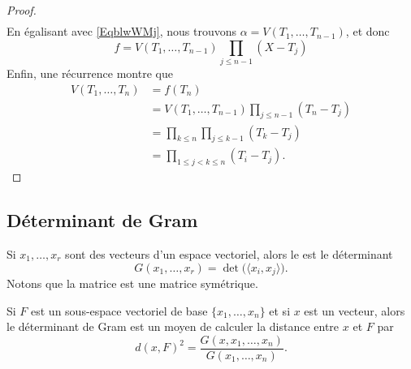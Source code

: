 \begin{proof}
\begin{subequations}
\begin{align}
        \end{align}
    \end{subequations}
    En égalisant avec \eqref{EqblwWMj}, nous trouvons \( \alpha=V(T_1,\ldots, T_{n-1})\), et donc
    \begin{equation}
        f=V(T_1,\ldots, T_{n-1})\prod_{j\leq n-1}(X-T_j)
    \end{equation}
    Enfin, une récurrence montre que
    \begin{subequations}
        \begin{align}
            V(T_1,\ldots, T_n)&=f(T_n)\\
            &=V(T_1,\ldots, T_{n-1})\prod_{j\leq n-1}(T_n-T_j)\\
            &=\prod_{k\leq n}\prod_{j\leq k-1}(T_k-T_j)\\
            &=\prod_{1\leq j<k\leq n}(T_i-T_j).
        \end{align}
    \end{subequations}
\end{proof}

\subsection{Déterminant de Gram}

Si \( x_1,\ldots, x_r\) sont des vecteurs d'un espace vectoriel, alors le  est le déterminant
\begin{equation}
    G(x_1,\ldots, x_r)=\det\big( \langle x_i, x_j\rangle  \big).
\end{equation}
Notons que la matrice est une matrice symétrique.

\begin{proposition}\label{PropMsZhIK}
    Si \( F\) est un sous-espace vectoriel de base \( \{ x_1,\ldots, x_n \}\) et si \( x\) est un vecteur, alors le déterminant de Gram est un moyen de calculer la distance entre \( x\) et \( F\) par 
    \begin{equation}
        d(x,F)^2=\frac{ G(x,x_1,\ldots, x_n)}{ G(x_1,\ldots, x_n) }.
    \end{equation}
\end{proposition}

